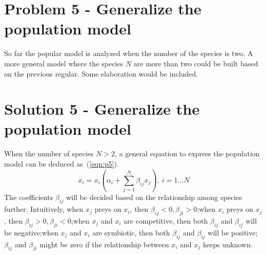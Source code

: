 \documentclass[a4paper,twocolumn]{article} %
\begin{document}
\section*{Problem 5 - Generalize the population model}
\label{sec:prob5} 
So far the popular model is analyzed when the number of the species is two. A more general model where the species $N$ are more than two could be built based on the previous regular. Some elaboration would be included. 

\section*{Solution 5 - Generalize the population model}
\label{sec:solu5}
When the number of species $N>2$, a general equation to express the population model can be deduced as~(\ref{eqn:p5}).
\begin{equation}\label{eqn:p5}
   \dot{x}_i = x_i(\alpha_i+ \sum_{j=1}^{N} \beta_{ij}x_j), ~i=1...N
\end{equation}
The coefficients $\beta_{ij}$ will be decided based on the relationship among species further. Intuitively, when $x_j$ preys on $x_i$, then $\beta_{ij}<0, \beta_{ji}>0$;when $x_i$ preys on $x_j$, then $\beta_{ij}>0, \beta_{ji}<0$;when $x_j$ and $x_i$ are competitive, then both $\beta_{ij}$ and $\beta_{ij}$ will be negative;when $x_j$ and $x_i$ are symbiotic, then both $\beta_{ij}$ and $\beta_{ij}$ will be positive;$\beta_{ij}$ and $\beta_{ji}$ might be zero if the relationship between $x_i$ and $x_j$ keeps unknown. 

\end{document}
